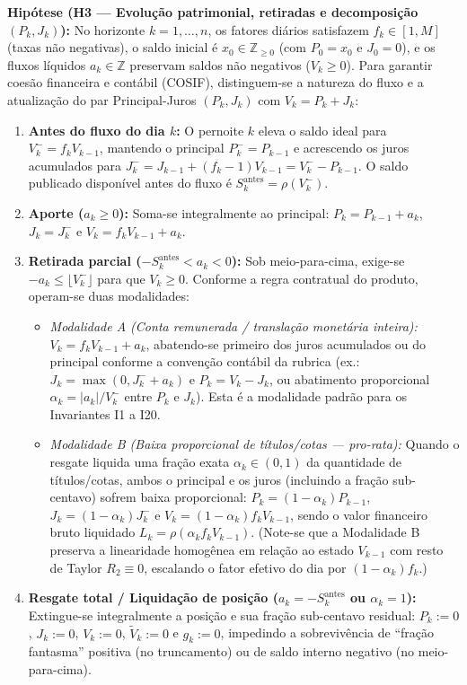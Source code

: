 \documentclass[11pt, a4paper]{article}
\theoremstyle{definition}
\theoremstyle{plain}
\theoremstyle{remark}
\begin{document}
\noindent\textbf{Hipótese (H3 — Evolução patrimonial, retiradas e decomposição $(P_k, J_k)$):} No horizonte $k = 1, \dots, n$, os fatores diários satisfazem $f_k \in [1, M]$ (taxas não negativas), o saldo inicial é $x_0 \in \mathbb{Z}_{\ge 0}$ (com $P_0 = x_0$ e $J_0 = 0$), e os fluxos líquidos $a_k \in \mathbb{Z}$ preservam saldos não negativos ($V_k \ge 0$). Para garantir coesão financeira e contábil (COSIF), distinguem-se a natureza do fluxo e a atualização do par Principal-Juros $(P_k, J_k)$ com $V_k = P_k + J_k$:
\begin{enumerate}[label=(\roman*)]
    \item \textbf{Antes do fluxo do dia $k$:} O pernoite $k$ eleva o saldo ideal para $V_k^- = f_k V_{k-1}$, mantendo o principal $P_k^- = P_{k-1}$ e acrescendo os juros acumulados para $J_k^- = J_{k-1} + (f_k - 1)V_{k-1} = V_k^- - P_{k-1}$. O saldo publicado disponível antes do fluxo é $S_k^{\text{antes}} = \rho(V_k^-)$.
    \item \textbf{Aporte ($a_k \ge 0$):} Soma-se integralmente ao principal: $P_k = P_{k-1} + a_k$, $J_k = J_k^-$ e $V_k = f_k V_{k-1} + a_k$.
    \item \textbf{Retirada parcial ($-S_k^{\text{antes}} < a_k < 0$):} Sob meio-para-cima, exige-se $-a_k \le \lfloor V_k^- \rfloor$ para que $V_k \ge 0$. Conforme a regra contratual do produto, operam-se duas modalidades:
    \begin{itemize}
        \item \emph{Modalidade A (Conta remunerada / translação monetária inteira):} $V_k = f_k V_{k-1} + a_k$, abatendo-se primeiro dos juros acumulados ou do principal conforme a convenção contábil da rubrica (ex.: $J_k = \max(0, J_k^- + a_k)$ e $P_k = V_k - J_k$, ou abatimento proporcional $\alpha_k = |a_k|/V_k^-$ entre $P_k$ e $J_k$). Esta é a modalidade padrão para os Invariantes I1 a I20.
        \item \emph{Modalidade B (Baixa proporcional de títulos/cotas --- \emph{pro-rata}):} Quando o resgate liquida uma fração exata $\alpha_k \in (0, 1)$ da quantidade de títulos/cotas, ambos o principal e os juros (incluindo a fração sub-centavo) sofrem baixa proporcional: $P_k = (1 - \alpha_k)P_{k-1}$, $J_k = (1 - \alpha_k)J_k^-$ e $V_k = (1 - \alpha_k)f_k V_{k-1}$, sendo o valor financeiro bruto liquidado $L_k = \rho(\alpha_k f_k V_{k-1})$. (Note-se que a Modalidade B preserva a linearidade homogênea em relação ao estado $V_{k-1}$ com resto de Taylor $R_2 \equiv 0$, escalando o fator efetivo do dia por $(1-\alpha_k)f_k$.)
    \end{itemize}
    \item \textbf{Resgate total / Liquidação de posição ($a_k = -S_k^{\text{antes}}$ ou $\alpha_k = 1$):} Extingue-se integralmente a posição e sua fração sub-centavo residual: $P_k := 0$, $J_k := 0$, $V_k := 0$, $\tilde{V}_k := 0$ e $g_k := 0$, impedindo a sobrevivência de ``fração fantasma'' positiva (no truncamento) ou de saldo interno negativo (no meio-para-cima).
\end{enumerate}
\end{document}
